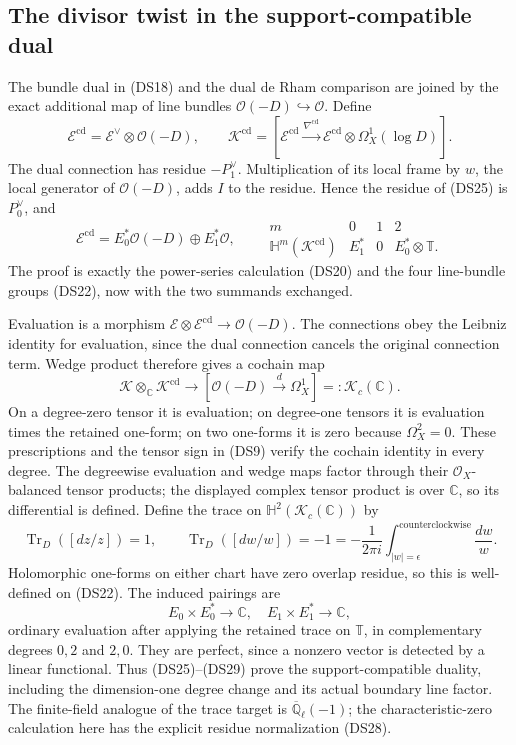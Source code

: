 \subsection{The divisor twist in the support-compatible dual}

The bundle dual in (DS18) and the dual de Rham comparison are joined
by the exact additional map of line bundles
$\mathcal O(-D)\hookrightarrow\mathcal O$.  Define
\[
 \mathscr E^{\mathrm{cd}}=\mathscr E^\vee\otimes\mathcal O(-D),
 \qquad
 \mathscr K^{\mathrm{cd}}=
 [\mathscr E^{\mathrm{cd}}\xrightarrow{\nabla^{\mathrm{cd}}}
  \mathscr E^{\mathrm{cd}}\otimes\Omega_X^1(\log D)].
 \tag{DS25}
\]
The dual connection has residue $-P_1^\vee$.  Multiplication of its
local frame by $w$, the local generator of $\mathcal O(-D)$, adds
$I$ to the residue.  Hence the residue of (DS25) is $P_0^\vee$,
and
\[
 \mathscr E^{\mathrm{cd}}
 =E_0^*\mathcal O(-D)\oplus E_1^*\mathcal O,
 \qquad
 \begin{array}{c|ccc}
 m&0&1&2\\\hline
 \mathbb H^m(\mathscr K^{\mathrm{cd}})&E_1^*&0&E_0^*\otimes\mathbb T.
 \end{array}
 \tag{DS26}
\]
The proof is exactly the power-series calculation (DS20) and the
four line-bundle groups (DS22), now with the two summands exchanged.

Evaluation is a morphism
$\mathscr E\otimes\mathscr E^{\mathrm{cd}}\to\mathcal O(-D)$.
The connections obey the Leibniz identity for evaluation, since the
dual connection cancels the original connection term.  Wedge product
therefore gives a cochain map
\[
 \mathscr K\otimes_{\mathbb C}\mathscr K^{\mathrm{cd}}
 \longrightarrow [\mathcal O(-D)\xrightarrow d\Omega_X^1]
 =:\mathscr K_c(\mathbb C).
 \tag{DS27}
\]
On a degree-zero tensor it is evaluation; on degree-one tensors it
is evaluation times the retained one-form; on two one-forms it is
zero because $\Omega_X^2=0$.  These prescriptions and the tensor
sign in (DS9) verify the cochain identity in every degree.
The degreewise evaluation and wedge maps factor through their
$\mathcal O_X$-balanced tensor products; the displayed complex
tensor product is over $\mathbb C$, so its differential is defined.
Define the trace on $\mathbb H^2(\mathscr K_c(\mathbb C))$ by
\[
 \operatorname{Tr}_D([dz/z])=1,\qquad
 \operatorname{Tr}_D([dw/w])=-1
 =-\frac1{2\pi i}\int_{|w|=\epsilon}^{\mathrm{counterclockwise}}\frac{dw}{w}.
 \tag{DS28}
\]
Holomorphic one-forms on either chart have zero overlap residue, so
this is well-defined on (DS22).  The induced pairings are
\[
 E_0\times E_0^*\to\mathbb C,
 \quad E_1\times E_1^*\to\mathbb C,
 \tag{DS29}
\]
ordinary evaluation after applying the retained trace on $\mathbb T$,
in complementary degrees $0,2$ and $2,0$.
They are perfect, since a nonzero vector is detected by a linear
functional.  Thus (DS25)--(DS29) prove the support-compatible
duality, including the dimension-one degree change and its actual
boundary line factor.  The finite-field analogue of the trace target
is $\overline{\mathbb Q}_\ell(-1)$; the characteristic-zero calculation
here has the explicit residue normalization (DS28).


